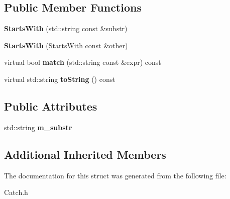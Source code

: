 \subsection*{Public Member Functions}
\begin{DoxyCompactItemize}
\item 
\hypertarget{struct_catch_1_1_matchers_1_1_impl_1_1_std_string_1_1_starts_with_a1940dacb184d129adb33acea73dedc17}{{\bfseries Starts\-With} (std\-::string const \&substr)}\label{struct_catch_1_1_matchers_1_1_impl_1_1_std_string_1_1_starts_with_a1940dacb184d129adb33acea73dedc17}

\item 
\hypertarget{struct_catch_1_1_matchers_1_1_impl_1_1_std_string_1_1_starts_with_a5526cb587632e7e46253d6f60ae01098}{{\bfseries Starts\-With} (\hyperlink{struct_catch_1_1_matchers_1_1_impl_1_1_std_string_1_1_starts_with}{Starts\-With} const \&other)}\label{struct_catch_1_1_matchers_1_1_impl_1_1_std_string_1_1_starts_with_a5526cb587632e7e46253d6f60ae01098}

\item 
\hypertarget{struct_catch_1_1_matchers_1_1_impl_1_1_std_string_1_1_starts_with_ae9c893adbacc853171a488aea5355653}{virtual bool {\bfseries match} (std\-::string const \&expr) const }\label{struct_catch_1_1_matchers_1_1_impl_1_1_std_string_1_1_starts_with_ae9c893adbacc853171a488aea5355653}

\item 
\hypertarget{struct_catch_1_1_matchers_1_1_impl_1_1_std_string_1_1_starts_with_a066fe10e74495cb556abc6895193ba97}{virtual std\-::string {\bfseries to\-String} () const }\label{struct_catch_1_1_matchers_1_1_impl_1_1_std_string_1_1_starts_with_a066fe10e74495cb556abc6895193ba97}

\end{DoxyCompactItemize}
\subsection*{Public Attributes}
\begin{DoxyCompactItemize}
\item 
\hypertarget{struct_catch_1_1_matchers_1_1_impl_1_1_std_string_1_1_starts_with_aebcdf35b98fd0097d9e9113b9219fcd1}{std\-::string {\bfseries m\-\_\-substr}}\label{struct_catch_1_1_matchers_1_1_impl_1_1_std_string_1_1_starts_with_aebcdf35b98fd0097d9e9113b9219fcd1}

\end{DoxyCompactItemize}
\subsection*{Additional Inherited Members}


The documentation for this struct was generated from the following file\-:\begin{DoxyCompactItemize}
\item 
Catch.\-h\end{DoxyCompactItemize}
